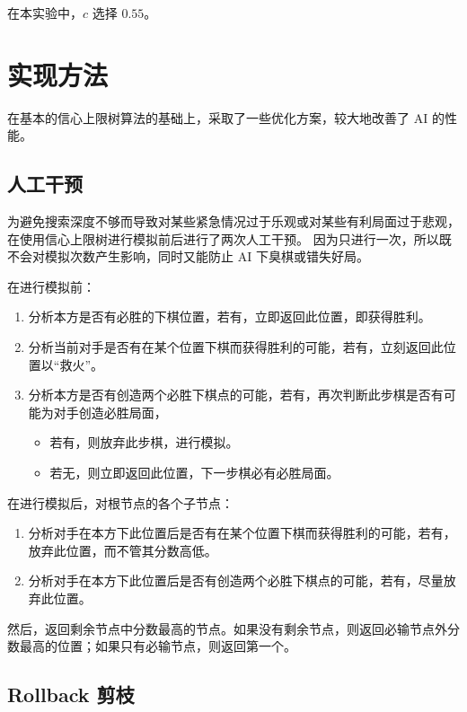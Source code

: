 \documentclass[a4paper]{article}
\begin{document}
在本实验中，$c$ 选择 $0.55$。

\section{实现方法}\label{sec:method}

在基本的信心上限树算法的基础上，采取了一些优化方案，较大地改善了 AI 的性能。

\subsection{人工干预}

为避免搜索深度不够而导致对某些紧急情况过于乐观或对某些有利局面过于悲观，在使用信心上限树进行模拟前后进行了两次人工干预。
因为只进行一次，所以既不会对模拟次数产生影响，同时又能防止 AI 下臭棋或错失好局。

在进行模拟前：

\begin{enumerate}
    \item 分析本方是否有必胜的下棋位置，若有，立即返回此位置，即获得胜利。
    \item 分析当前对手是否有在某个位置下棋而获得胜利的可能，若有，立刻返回此位置以“救火”。
    \item 分析本方是否有创造两个必胜下棋点的可能，若有，再次判断此步棋是否有可能为对手创造必胜局面，
          \begin{itemize}
              \item 若有，则放弃此步棋，进行模拟。
              \item 若无，则立即返回此位置，下一步棋必有必胜局面。
          \end{itemize}
\end{enumerate}

在进行模拟后，对根节点的各个子节点：

\begin{enumerate}
    \item 分析对手在本方下此位置后是否有在某个位置下棋而获得胜利的可能，若有，放弃此位置，而不管其分数高低。
    \item 分析对手在本方下此位置后是否有创造两个必胜下棋点的可能，若有，尽量放弃此位置。
\end{enumerate}

然后，返回剩余节点中分数最高的节点。如果没有剩余节点，则返回必输节点外分数最高的位置；如果只有必输节点，则返回第一个。

\subsection{Rollback 剪枝}
\end{document}
